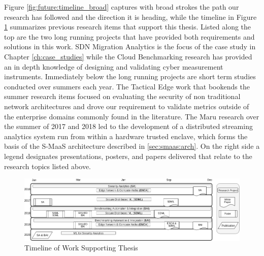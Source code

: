 Figure \ref{fig:future:timeline_broad} captures with broad strokes the path our research has followed and the direction it is heading, while the timeline in Figure \ref{fig:future:timeline_detail} summarizes previous research items that support this thesis. Listed along the top are the two long running projects that have provided both requirements and solutions in this work. SDN Migration Analytics is the focus of the case study in Chapter \ref{ch:case_studies} while the Cloud Benchmarking research has provided an in depth knowledge of designing and validating cyber measurement instruments. Immediately below the long running projects are short term studies conducted over summers each year. The Tactical Edge work that bookends the summer research items focused on evaluating the security of non traditional network architectures and drove our requirement to validate metrics outside of the enterprise domains commonly found in the literature. The Maru research over the summer of 2017 and 2018 led to the development of a distributed streaming analytics system run from within a hardware trusted enclave, which forms the basis of the S-MaaS architecture described in \ref{sec:smaas:arch}. On the right side a legend designates presentations, posters, and papers delivered that relate to the research topics listed above.


\begin{figure}[ht]
\centering
\includegraphics[width=\textwidth]{resource/img/ch_future/timeline.png}
\caption{Timeline of Work Supporting Thesis }
\label{fig:future:timeline_detail}
\end{figure} 


